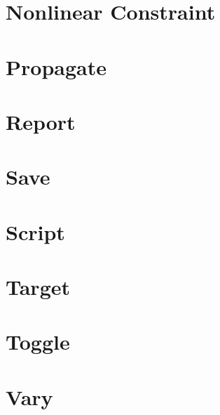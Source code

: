 \section{Nonlinear Constraint}


\section{Propagate}


\section{Report}


\section{Save}


\section{Script}


\section{Target}


\section{Toggle}


\section{Vary}


